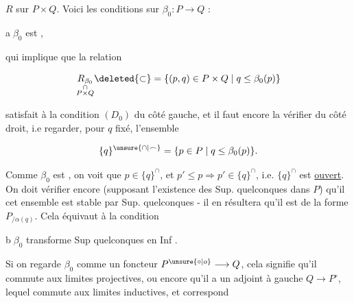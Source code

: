 
$R$ sur $P\times Q$. Voici les conditions sur $\beta_0:P\to Q$ :

\textcircled{a}\quad $\beta_0$ est \uline{},

  qui implique que la relation

\[
 \underset{\substack{\cap\\P\times Q}}{R_{\beta_0}}\deleted{\subset}
 =\{(p,q)\in P\times Q\mid q\leq\beta_0(p)\}
\]

satisfait à la condition $(D_0)$ du côté gauche, et il faut encore la vérifier du côté droit, i.e regarder, pour $q$ fixé, l'ensemble

\[
 \{q\}^{\unsure{\cap|\frown}}=\{p\in P\mid q\leq\beta_0(p)\}.
\]

Comme $\beta_0$ est , on voit que  $p\in\{q\}^\cap$, et $p'\leq p\Longrightarrow p'\in\{q\}^\cap$, i.e. $\{q\}^\cap$ est \uline{ouvert}.  On doit vérifier encore (supposant l'existence des Sup. quelconques dans $P$) qu'il  cet ensemble est stable par  Sup. quelconques - il en résultera qu'il est de la forme $P_{/\alpha(q)}$. Cela équivaut à la condition

\textcircled{b}\quad $\beta_0$ transforme Sup quelconques  en Inf .

\deleted{\unsure{(}} Si on regarde $\beta_0$ comme un  foncteur $P^{\unsure{\circ|o}}\longrightarrow Q$, cela signifie qu'il commute aux limites projectives, ou encore qu'il a un adjoint à gauche $Q\longrightarrow P^\circ$, lequel commute aux limites inductives, et correspond
